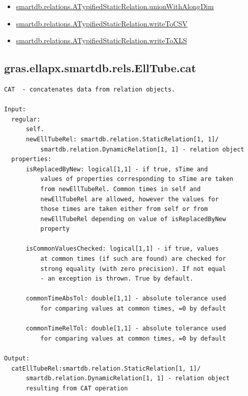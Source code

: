 \documentclass[letterpaper,10pt,english]{sphinxmanual}
\begin{document}
\begin{itemize}
\item {} 
{\hyperref[chap_functions:smartdb-relations-atypifiedstaticrelation-unionwithalongdim]{smartdb.relations.ATypifiedStaticRelation.unionWithAlongDim}}

\item {} 
{\hyperref[chap_functions:smartdb-relations-atypifiedstaticrelation-writetocsv]{smartdb.relations.ATypifiedStaticRelation.writeToCSV}}

\item {} 
{\hyperref[chap_functions:smartdb-relations-atypifiedstaticrelation-writetoxls]{smartdb.relations.ATypifiedStaticRelation.writeToXLS}}

\end{itemize}


\subsection{gras.ellapx.smartdb.rels.EllTube.cat}
\label{chap_functions:gras-ellapx-smartdb-rels-elltube-cat}
\begin{Verbatim}[commandchars=\\\{\}]
CAT  - concatenates data from relation objects.

Input:
  regular:
      self.
      newEllTubeRel: smartdb.relation.StaticRelation[1, 1]/
          smartdb.relation.DynamicRelation[1, 1] - relation object
  properties:
      isReplacedByNew: logical[1,1] - if true, sTime and
          values of properties corresponding to sTime are taken
          from newEllTubeRel. Common times in self and
          newEllTubeRel are allowed, however the values for
          those times are taken either from self or from
          newEllTubeRel depending on value of isReplacedByNew
          property

      isCommonValuesChecked: logical[1,1] - if true, values
          at common times (if such are found) are checked for
          strong equality (with zero precision). If not equal
          - an exception is thrown. True by default.

      commonTimeAbsTol: double[1,1] - absolute tolerance used
          for comparing values at common times, =0 by default

      commonTimeRelTol: double[1,1] - absolute tolerance used
          for comparing values at common times, =0 by default

Output:
  catEllTubeRel:smartdb.relation.StaticRelation[1, 1]/
      smartdb.relation.DynamicRelation[1, 1] - relation object
      resulting from CAT operation
\end{Verbatim}
\end{document}
